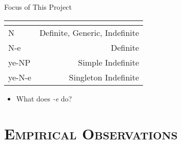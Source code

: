 \documentclass[10pt]{beamer}
\begin{document}
\begin {frame} {Focus of This Project}

\begin {tabular}{l | r}
\multicolumn{2}{c}{} \\\hline
\hspace{0.44cm}N & Definite, Generic, Indefinite\\ \hline
\hspace{0.44cm}N-{\color {red}e} & Definite \\ \hline
{\color {ggreen}ye}-NP & Simple Indefinite\\ \hline
{\color {ggreen}ye}-N-{\color {red}e} & Singleton Indefinite\\ \hline
\end {tabular}
\pause
\begin {itemize} 
	\item What does \emph{-{\color {red}e}} do?
\end {itemize}

\end {frame}

\section {\scshape Empirical Observations}
\end{document}
